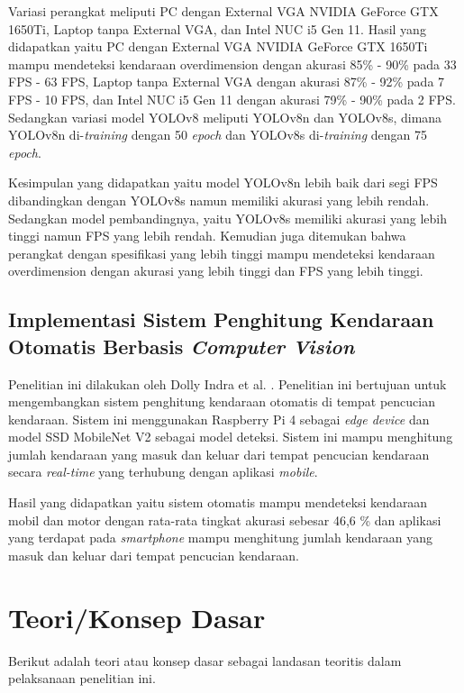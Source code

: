 Variasi perangkat meliputi PC dengan External VGA NVIDIA GeForce GTX 1650Ti, Laptop tanpa External VGA, dan Intel NUC i5 Gen 11. Hasil yang didapatkan yaitu PC dengan External VGA NVIDIA GeForce GTX 1650Ti mampu mendeteksi kendaraan overdimension dengan akurasi 85\% - 90\% pada 33 FPS - 63 FPS, Laptop tanpa External VGA dengan akurasi 87\% - 92\% pada 7 FPS - 10 FPS, dan Intel NUC i5 Gen 11 dengan akurasi 79\% - 90\% pada 2 FPS. Sedangkan variasi model YOLOv8 meliputi YOLOv8n dan YOLOv8s, dimana YOLOv8n di-\emph{training} dengan 50 \emph{epoch} dan YOLOv8s di-\emph{training} dengan 75 \emph{epoch}.

Kesimpulan yang didapatkan yaitu model YOLOv8n lebih baik dari segi FPS dibandingkan dengan YOLOv8s namun memiliki akurasi yang lebih rendah. Sedangkan model pembandingnya, yaitu YOLOv8s memiliki akurasi yang lebih tinggi namun FPS yang lebih rendah. Kemudian juga ditemukan bahwa perangkat dengan spesifikasi yang lebih tinggi mampu mendeteksi kendaraan overdimension dengan akurasi yang lebih tinggi dan FPS yang lebih tinggi.

\subsection{Implementasi Sistem Penghitung Kendaraan Otomatis Berbasis \emph{Computer Vision}}
\label{subsec:implementasisistemhitungkendaraan}
Penelitian ini dilakukan oleh Dolly Indra et al. \parencite*{dolly2023}. Penelitian ini bertujuan untuk mengembangkan sistem penghitung kendaraan otomatis di tempat pencucian kendaraan. Sistem ini menggunakan Raspberry Pi 4 sebagai \emph{edge device} dan model SSD MobileNet V2 sebagai model deteksi. Sistem ini mampu menghitung jumlah kendaraan yang masuk dan keluar dari tempat pencucian kendaraan secara \emph{real-time} yang terhubung dengan aplikasi \emph{mobile}.

Hasil yang didapatkan yaitu sistem otomatis mampu mendeteksi kendaraan mobil dan motor dengan rata-rata tingkat akurasi sebesar 46,6 \% dan aplikasi yang terdapat pada \emph{smartphone} mampu menghitung jumlah kendaraan yang masuk dan keluar dari tempat pencucian kendaraan.

\section{Teori/Konsep Dasar}
\label{sec:teorikonsepdasar}
 Berikut adalah teori atau konsep dasar sebagai landasan teoritis dalam pelaksanaan penelitian ini.
 
